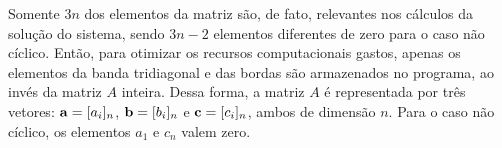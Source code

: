 \documentclass[a4,12pt]{horizon-theme}
\begin{document}
Somente $3n$ dos elementos da matriz são, de fato, relevantes nos cálculos da solução do sistema, sendo $3n-2$ elementos diferentes de zero para o caso não cíclico. Então, para otimizar os recursos computacionais gastos, apenas os elementos da banda tridiagonal e das bordas são armazenados no programa, ao invés da matriz $A$ inteira. Dessa forma, a matriz $A$ é representada por três vetores: ${\bf a}=[a_i]_n$, ${\bf b}=[b_i]_n$ e ${\bf c}=[c_i]_n$, ambos de dimensão $n$. Para o caso não cíclico, os elementos $a_1$ e $c_n$ valem zero.





\end{document}
